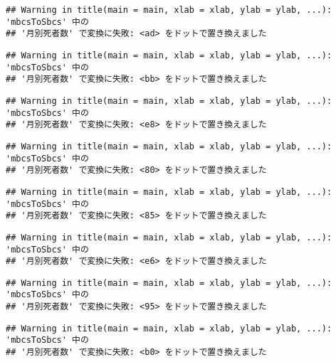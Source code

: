 \documentclass[]{article}
\begin{document}
\begin{verbatim}
## Warning in title(main = main, xlab = xlab, ylab = ylab, ...): 'mbcsToSbcs' 中の
## '月別死者数' で変換に失敗: <ad> をドットで置き換えました
\end{verbatim}

\begin{verbatim}
## Warning in title(main = main, xlab = xlab, ylab = ylab, ...): 'mbcsToSbcs' 中の
## '月別死者数' で変換に失敗: <bb> をドットで置き換えました
\end{verbatim}

\begin{verbatim}
## Warning in title(main = main, xlab = xlab, ylab = ylab, ...): 'mbcsToSbcs' 中の
## '月別死者数' で変換に失敗: <e8> をドットで置き換えました
\end{verbatim}

\begin{verbatim}
## Warning in title(main = main, xlab = xlab, ylab = ylab, ...): 'mbcsToSbcs' 中の
## '月別死者数' で変換に失敗: <80> をドットで置き換えました
\end{verbatim}

\begin{verbatim}
## Warning in title(main = main, xlab = xlab, ylab = ylab, ...): 'mbcsToSbcs' 中の
## '月別死者数' で変換に失敗: <85> をドットで置き換えました
\end{verbatim}

\begin{verbatim}
## Warning in title(main = main, xlab = xlab, ylab = ylab, ...): 'mbcsToSbcs' 中の
## '月別死者数' で変換に失敗: <e6> をドットで置き換えました
\end{verbatim}

\begin{verbatim}
## Warning in title(main = main, xlab = xlab, ylab = ylab, ...): 'mbcsToSbcs' 中の
## '月別死者数' で変換に失敗: <95> をドットで置き換えました
\end{verbatim}

\begin{verbatim}
## Warning in title(main = main, xlab = xlab, ylab = ylab, ...): 'mbcsToSbcs' 中の
## '月別死者数' で変換に失敗: <b0> をドットで置き換えました
\end{verbatim}
\end{document}
